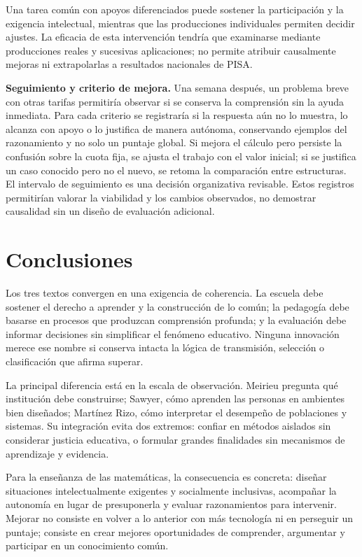 \documentclass[spanish,letterpaper,oneside]{article}
\begin{document}
Una tarea común con apoyos diferenciados puede sostener la participación y la exigencia intelectual, mientras que las producciones individuales permiten decidir ajustes. La eficacia de esta intervención tendría que examinarse mediante producciones reales y sucesivas aplicaciones; no permite atribuir causalmente mejoras ni extrapolarlas a resultados nacionales de PISA.

\textbf{Seguimiento y criterio de mejora.} Una semana después, un problema breve con otras tarifas permitiría observar si se conserva la comprensión sin la ayuda inmediata. Para cada criterio se registraría si la respuesta aún no lo muestra, lo alcanza con apoyo o lo justifica de manera autónoma, conservando ejemplos del razonamiento y no solo un puntaje global. Si mejora el cálculo pero persiste la confusión sobre la cuota fija, se ajusta el trabajo con el valor inicial; si se justifica un caso conocido pero no el nuevo, se retoma la comparación entre estructuras. El intervalo de seguimiento es una decisión organizativa revisable. Estos registros permitirían valorar la viabilidad y los cambios observados, no demostrar causalidad sin un diseño de evaluación adicional.

\clearpage
\section{Conclusiones}

Los tres textos convergen en una exigencia de coherencia. La escuela debe sostener el derecho a aprender y la construcción de lo común; la pedagogía debe basarse en procesos que produzcan comprensión profunda; y la evaluación debe informar decisiones sin simplificar el fenómeno educativo. Ninguna innovación merece ese nombre si conserva intacta la lógica de transmisión, selección o clasificación que afirma superar.

La principal diferencia está en la escala de observación. Meirieu pregunta qué institución debe construirse; Sawyer, cómo aprenden las personas en ambientes bien diseñados; Martínez Rizo, cómo interpretar el desempeño de poblaciones y sistemas. Su integración evita dos extremos: confiar en métodos aislados sin considerar justicia educativa, o formular grandes finalidades sin mecanismos de aprendizaje y evidencia.

Para la enseñanza de las matemáticas, la consecuencia es concreta: diseñar situaciones intelectualmente exigentes y socialmente inclusivas, acompañar la autonomía en lugar de presuponerla y evaluar razonamientos para intervenir. Mejorar no consiste en volver a lo anterior con más tecnología ni en perseguir un puntaje; consiste en crear mejores oportunidades de comprender, argumentar y participar en un conocimiento común.
\end{document}
